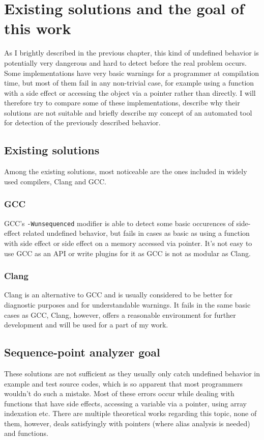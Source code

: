 \chapter{Existing solutions and the goal of this work}
As I brightly described in the previous chapter, this kind of undefined behavior is potentially very dangerous and hard to detect before the real problem occurs. Some implementations have very basic warnings for a programmer at compilation time, but most of them fail in any non-trivial case, for example using a function with a side effect or accessing the object via a pointer rather than directly. I will therefore try to compare some of these implementations, describe why their solutions are not suitable and briefly describe my concept of an automated tool for detection of the previously described behavior.
\section{Existing solutions}
Among the existing solutions, most noticeable are the ones included in widely used compilers, Clang and GCC.
\subsection{GCC}
GCC's \verb|-Wunsequenced| modifier is able to detect some basic occurences of side-effect related undefined behavior, but fails in cases as basic as using a function with side effect or side effect on a memory accessed via pointer. It's not easy to use GCC as an API or write plugins for it as GCC is not as modular as Clang.\cite{ClangComparison}
\subsection{Clang}
Clang is an alternative to GCC and is usually considered to be better for diagnostic purposes and for understandable warnings. It fails in the same basic cases as GCC, Clang, however, offers a reasonable environment for further development and will be used for a part of my work.
\section{Sequence-point analyzer goal}
These solutions are not sufficient as they usually only catch undefined behavior in example and test source codes, which is so apparent that most programmers wouldn't do such a mistake. Most of these errors occur while dealing with functions that have side effects, accessing a variable via a pointer, using array indexation etc.
There are multiple theoretical works regarding this topic, none of them, however, deals satisfyingly with pointers (where alias analysis is needed)\cite{AliasWiki} and functions.

